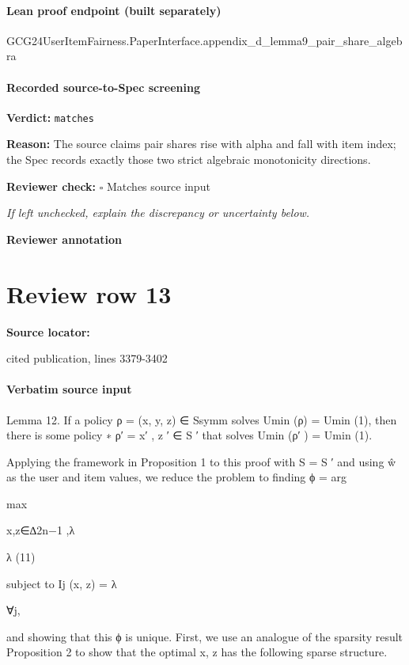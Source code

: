 \documentclass[10pt]{article}
\newcommand{\reviewerbox}{%
  \par\noindent\fbox{\parbox{0.96\linewidth}{\rule{0pt}{0.38in}}}\par
}
\newcommand{\reviewmatch}[1]{%
  \par\noindent\textbf{Reviewer check:} $\square$\; #1\par
  \noindent\emph{If left unchecked, explain the discrepancy or uncertainty below.}\par
}
\begin{document}
\paragraph{Lean proof endpoint (built separately)}\begin{ReviewVerbatim}
GCG24UserItemFairness.PaperInterface.appendix_d_lemma9_pair_share_algebra
\end{ReviewVerbatim}

\paragraph{Recorded source-to-Spec screening}
\textbf{Verdict:} \texttt{matches}
\\
{\raggedright
\textbf{Reason:} The source claims pair shares rise with alpha and fall with item index;\allowbreak{} the Spec records exactly those two strict algebraic monotonicity directions.\allowbreak{}
\par}
\reviewmatch{Matches source input}
\noindent\textbf{Reviewer annotation}\par
\reviewerbox
\clearpage
\hypertarget{source-claim-e72b5fec2071cbe5}{}
\section*{Review row 13}
\textbf{Source locator:} {\footnotesize\raggedright cited publication, lines 3379-\allowbreak{}3402\par}
\paragraph{Verbatim source input}
\begin{ReviewVerbatim}
Lemma 12. If a policy ρ = (x, y, z) ∈ Ssymm solves Umin (ρ) = Umin
(1), then there is some policy
∗
ρ′ = x′ , z ′ ∈ S ′ that solves Umin (ρ′ ) = Umin
(1).

Applying the framework in Proposition 1 to this proof with S = S ′ and using ŵ as the user and item
values, we reduce the problem to finding
ϕ = arg

max

x,z∈∆2n−1 ,λ

λ
(11)

subject to Ij (x, z) = λ

∀j,

and showing that this ϕ is unique.
First, we use an analogue of the sparsity result Proposition 2 to show that the optimal x, z has the
following sparse structure.
\end{ReviewVerbatim}
\end{document}
